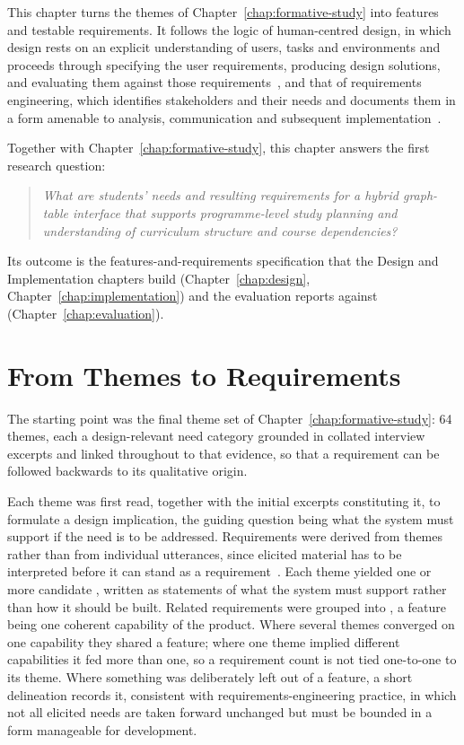 \label{chap:from-themes-to-requirements}

This chapter turns the themes of Chapter~\ref{chap:formative-study} into features and testable requirements. It follows the logic of human-centred design, in which design rests on an explicit understanding of users, tasks and environments and proceeds through specifying the user requirements, producing design solutions, and evaluating them against those requirements~\cite{iso9241_210}, and that of requirements engineering, which identifies stakeholders and their needs and documents them in a form amenable to analysis, communication and subsequent implementation~\cite[p.~37]{nuseibeh_requirements_2000}.

Together with Chapter~\ref{chap:formative-study}, this chapter answers the first research question:

\begin{quote}
\textit{What are students' needs and resulting requirements for a hybrid graph-table interface that supports programme-level study planning and understanding of curriculum structure and course dependencies?}
\end{quote}

Its outcome is the features-and-requirements specification that the Design and Implementation chapters build (Chapter~\ref{chap:design}, Chapter~\ref{chap:implementation}) and the evaluation reports against (Chapter~\ref{chap:evaluation}).

\section{From Themes to Requirements}
\label{sec:derivation-process}

The starting point was the final theme set of Chapter~\ref{chap:formative-study}: 64 themes, each a design-relevant need category grounded in collated interview excerpts and linked throughout to that evidence, so that a requirement can be followed backwards to its qualitative origin.

Each theme was first read, together with the initial excerpts constituting it, to formulate a design implication, the guiding question being what the system must support if the need is to be addressed. Requirements were derived from themes rather than from individual utterances, since elicited material has to be interpreted before it can stand as a requirement~\cite[p.~39]{nuseibeh_requirements_2000}. Each theme yielded one or more candidate , written as statements of what the system must support rather than how it should be built. Related requirements were grouped into \emph{}, a feature being one coherent capability of the product. Where several themes converged on one capability they shared a feature; where one theme implied different capabilities it fed more than one, so a requirement count is not tied one-to-one to its theme. Where something was deliberately left out of a feature, a short delineation records it, consistent with requirements-engineering practice, in which not all elicited needs are taken forward unchanged but must be bounded in a form manageable for development.

